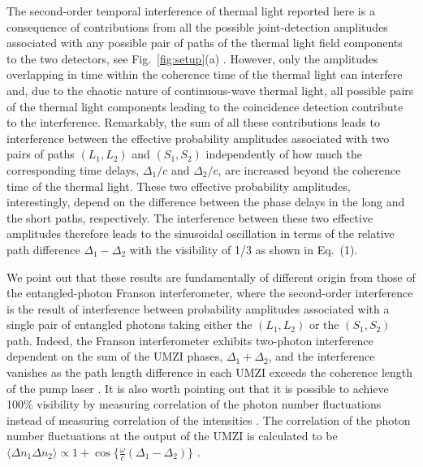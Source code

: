 \documentclass[aps,prl,reprint,showpacs,superscriptaddress]{revtex4-1}
\begin{document}
 
The  second-order temporal interference of thermal light reported here is a consequence of contributions from all the possible joint-detection amplitudes  associated with any possible pair of paths of the thermal light field components to the two detectors, see Fig.~\ref{fig:setup}(a) \cite{Tamma16a}.  However, only the amplitudes overlapping in time within the coherence time of the thermal light can interfere and, due to the chaotic nature of continuous-wave thermal light, all possible pairs of the thermal light components leading to the coincidence detection contribute to the interference.  Remarkably, the sum of all these contributions leads to interference between the effective probability amplitudes associated with two pairs of paths  $(L_1,L_2)$ and $(S_1,S_2)$ independently of how much the corresponding time delays, $\Delta_1/c$ and $\Delta_2/c$, are increased beyond the coherence time of the thermal light. These two effective probability amplitudes, interestingly, depend on the difference between the phase delays in the long and the short paths, respectively. The interference between these two effective amplitudes therefore leads to the sinusoidal oscillation in terms  of the relative path difference $\Delta_1 - \Delta_2$ with the visibility of 1/3 as shown in Eq.~(1). 


We point out that these results are  fundamentally of different origin from those of the entangled-photon Franson interferometer, where the second-order interference is the result of interference between probability amplitudes associated with a single pair of entangled photons taking either the $(L_1,L_2)$ or the $(S_1,S_2)$ path. Indeed, the Franson interferometer  exhibits  two-photon interference dependent on the sum of the UMZI phases, $\Delta_1 + \Delta_2$, and the interference vanishes as the path length difference in each UMZI exceeds the coherence length of the pump laser \cite{Franson89,Shih93a,Kwiat93a,Strekalov96}. It is also worth pointing out that it is possible to achieve 100\% visibility by measuring correlation of the photon number fluctuations instead of measuring correlation of the intensities \cite{Scarcelli04a,Ferri05b,Agafonov09,Chen13}. The correlation of the photon number fluctuations at the output of the UMZI  is  calculated to be $\langle\Delta n_{1}\Delta n_{2}\rangle \propto 1+\cos\{\frac{\omega}{c} (\Delta_{1}-\Delta_{2})\}$ \cite{Tamma16a}. 
\end{document}
